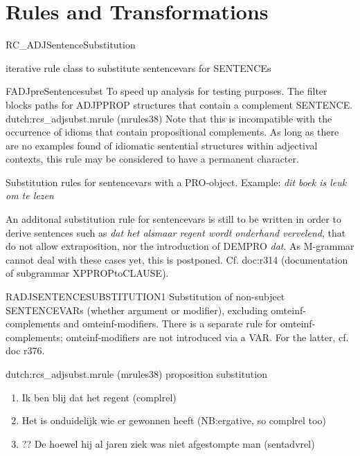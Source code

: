 \section{Rules and Transformations}
\begin{mruleclass}{RC\_ADJSentenceSubstitution}
\begin{classdescr}
\kind iterative rule class
\classtask to substitute sentencevars for SENTENCEs
\classremarks

\nofilters

\begin{speedrules}
\begin{member}
 FADJpreSentencesubst
 To speed up analysis for testing purposes. 
The filter blocks paths for ADJPPROP 
structures 
that contain a complement SENTENCE. 
\file dutch:rcs\_adjsubst.mrule (mrules38)
\remarks
Note that this is incompatible with the
occurrence of idioms that contain propositional complements. 
As long as there are no examples found of idiomatic sentential 
structures within adjectival contexts, this rule may be 
considered to have a permanent character.
\end{member}
\end{speedrules}


\begin{plannedrules}
\item 
Substitution rules for sentencevars with a PRO-object.
Example: {\em dit boek is leuk om te lezen}
\item 
An additonal substitution rule for sentencevars 
is still to be written in order to derive
sentences such as {\em dat het alsmaar regent wordt onderhand vervelend}, 
that do not allow extraposition, nor the introduction of DEMPRO {\em dat}. 
As M-grammar cannot deal with these cases
yet, this is postponed. Cf. doc:r314 (documentation of 
subgrammar XPPROPtoCLAUSE).
\end{plannedrules}

\norulesnotince
{}
\end{classdescr}

\begin{members}
\begin{member}
 RADJSENTENCESUBSTITUTION1
 Substitution of non-subject SENTENCEVARs
(whether argument or modifier),
excluding omteinf-complements and omteinf-modifiers. There is a separate rule 
for omteinf-complements; omteinf-modifiers are not introduced via a VAR. For
the latter, cf. doc r376.

\file dutch:rcs\_adjsubst.mrule (mrules38)
\semantics proposition substitution
\example\mbox{}
\begin{enumerate}
  \item Ik ben blij dat het regent (complrel)
  \item Het is onduidelijk wie er gewonnen heeft (NB:ergative, so complrel too)
  \item ?? De hoewel hij al jaren ziek was niet afgestompte man (sentadvrel)
\end{enumerate}



\end{member}
\end{members}
\end{mruleclass}
